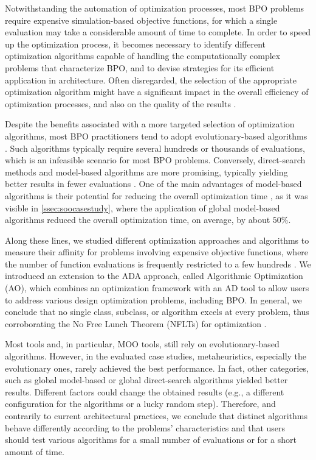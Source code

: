 Notwithstanding the automation of optimization processes, most \ac{BPO} problems require expensive simulation-based objective functions, for which a single evaluation may take a considerable amount of time to complete. In order to speed up the optimization process, it becomes necessary to identify different optimization algorithms capable of handling the computationally complex problems that characterize \ac{BPO}, and to devise strategies for its efficient application in architecture. Often disregarded, the selection of the appropriate optimization algorithm might have a significant impact in the overall efficiency of optimization processes, and also on the quality of the results \cite{Wolpert1997NFLT}. 

Despite the benefits associated with a more targeted selection of optimization algorithms, most \ac{BPO} practitioners tend to adopt evolutionary-based algorithms \cite{Evins2013, Nguyen2014}. Such algorithms typically require several hundreds or thousands of evaluations, which is an infeasible scenario for most \ac{BPO} problems. Conversely, direct-search methods and model-based algorithms are more promising, typically yielding better results in fewer evaluations \cite{Waibel2018}. One of the main advantages of model-based algorithms is their potential for reducing the overall optimization time \cite{Wortmann2017GABESTCHOICE}, as it was visible in \cref{ssec:soocasestudy}, where the application of global model-based algorithms reduced the overall optimization time, on average, by about $50\%$. 

Along these lines, we studied different optimization approaches and algorithms to measure their affinity for problems involving expensive objective functions, where the number of function evaluations is frequently restricted to a few hundreds \cite{Caetano2018,Belem2018optimizeddesign,Belem2019MOO,IP2019MOO}. We introduced an extension to the \ac{ADA} approach, called Algorithmic Optimization (\ac{AO}), which combines an optimization framework with an \ac{AD} tool to allow users to address various design optimization problems, including \ac{BPO}. In general, we conclude that no single class, subclass, or algorithm excels at every problem, thus corroborating the No Free Lunch Theorem (\acp{NFLT}) for optimization \cite{Wolpert1997NFLT}.  

Most tools and, in particular, \ac{MOO} tools, still rely on evolutionary-based algorithms. However, in the evaluated case studies, metaheuristics, especially the evolutionary ones, rarely achieved the best performance. In fact, other categories, such as global model-based or global direct-search algorithms yielded better results. Different factors could change the obtained results (e.g., a different configuration for the algorithms or a lucky random step). Therefore, and contrarily to current architectural practices, we conclude that distinct algorithms behave differently according to the problems' characteristics and that users should test various algorithms for a small number of evaluations or for a short amount of time. 

